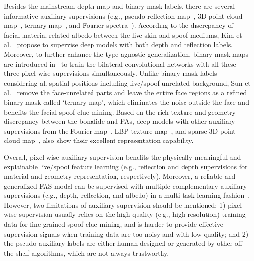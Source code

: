 \documentclass[10pt,journal,compsoc]{IEEEtran}
\begin{document}








 Besides the mainstream depth map and binary mask labels, there are several informative auxiliary supervisions (e.g., pseudo reflection map~\cite{kim2019basn,yu2020face,zhang2020celeba}, 3D point cloud map~\cite{li3dpc}, ternary map~\cite{sun2020face}, and Fourier spectra~\cite{roy2021bi}). According to the discrepancy of facial material-related albedo between the live skin and spoof mediums, Kim et al.~\cite{kim2019basn} propose to supervise deep models with both depth and reflection labels. Moreover, to further enhance the type-agnostic generalization, binary mask maps are introduced in~\cite{yu2020face} to train the bilateral convolutional networks with all these three pixel-wise supervisions simultaneously. Unlike binary mask labels considering all spatial positions including live/spoof-unrelated background, Sun et al.~\cite{sun2020face} remove the face-unrelated parts and leave the entire face regions as a refined binary mask called `ternary map', which eliminates the noise outside the face and benefits the facial spoof clue mining. Based on the rich texture and geometry discrepancy between the bonafide and PAs, deep models with other auxiliary supervisions from the Fourier map~\cite{jourabloo2018face,roy2021bi}, LBP texture map~\cite{zhang2020face}, and sparse 3D point cloud map~\cite{li3dpc}, also show their excellent representation capability.  


Overall, pixel-wise auxiliary supervision benefits the physically meaningful and explainable live/spoof feature learning (e.g., reflection and depth supervisions for material and geometry representation, respectively). Moreover, a reliable and generalized FAS model can be supervised with multiple complementary auxiliary supervisions (e.g., depth, reflection, and albedo) in a multi-task learning fashion~\cite{yu2020face}. However, two limitations of auxiliary supervision should be mentioned: 1) pixel-wise supervision usually relies on the high-quality (e.g., high-resolution) training data for fine-grained spoof clue mining, and is harder to provide effective supervision signals when training data are too noisy and with low quality; and 2) the pseudo auxiliary labels are either human-designed or generated by other off-the-shelf algorithms, which are not always trustworthy. 
\end{document}
